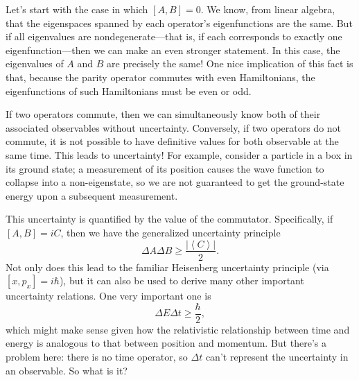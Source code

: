 \documentclass[../p052main.tex]{subfiles}
\begin{document}
Let's start with the case in which $[A,B] = 0$.
We know, from linear algebra, that the eigenspaces spanned by each operator's eigenfunctions are the same.
But if all eigenvalues are nondegenerate---that is, if each corresponds to exactly one eigenfunction---then we can make an even stronger statement.
In this case, the eigenvalues of $A$ and $B$ are precisely the same!
One nice implication of this fact is that, because the parity operator commutes with even Hamiltonians, the eigenfunctions of such Hamiltonians must be even or odd.

If two operators commute, then we can simultaneously know both of their associated observables without uncertainty.
Conversely, if two operators do not commute, it is not possible to have definitive values for both observable at the same time.
This leads to uncertainty!
For example, consider a particle in a box in its ground state; a measurement of its position causes the wave function to collapse into a non-eigenstate, so we are not guaranteed to get the ground-state energy upon a subsequent measurement.

This uncertainty is quantified by the value of the commutator.
Specifically, if $[A, B] = iC$, then we have the generalized uncertainty principle
\[ \Delta A \Delta B \geq \frac{|\left< C \right>|}{2}. \]
Not only does this lead to the familiar Heisenberg uncertainty principle (via $[x, p_x] = i\hbar$), but it can also be used to derive many other important uncertainty relations.
One very important one is
\[ \Delta E \Delta t \geq \frac{\hbar}{2}, \]
which might make sense given how the relativistic relationship between time and energy is analogous to that between position and momentum.
But there's a problem here: there is no time operator, so $\Delta t$ can't represent the uncertainty in an observable.
So what is it?
\end{document}
